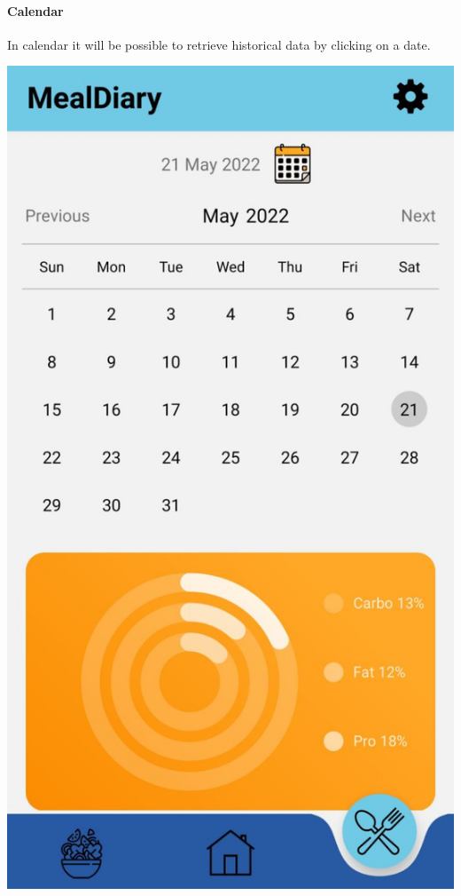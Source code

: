 \documentclass[12pt,hidelinks]{article}
\begin{document}
	\paragraph{Calendar}
	In calendar it will be possible to retrieve historical data by clicking on a date. 
	\begin{center}

	\includegraphics[scale=0.2]{screenshot4}
\end{center}
\newpage
\end{document}
